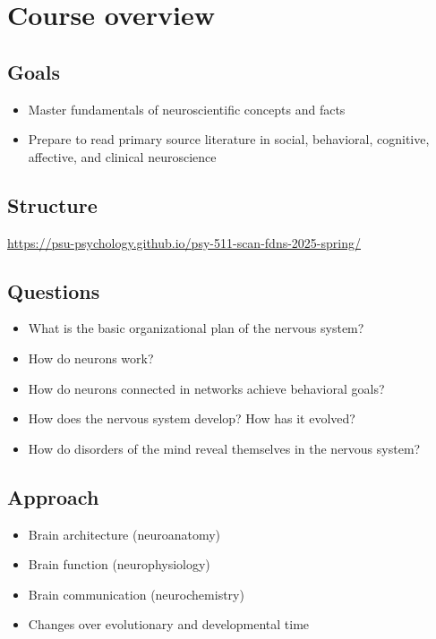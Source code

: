 \documentclass[
  letterpaper,
  DIV=11,
  numbers=noendperiod]{scrartcl}
\providecommand{\tightlist}{%
  \setlength{\itemsep}{0pt}\setlength{\parskip}{0pt}}\usepackage{longtable,booktabs,array}
\begin{document}
\section{Course overview}\label{course-overview}

\subsection{Goals}\label{goals}

\begin{itemize}
\tightlist
\item
  Master fundamentals of neuroscientific concepts and facts
\item
  Prepare to read primary source literature in social, behavioral,
  cognitive, affective, and clinical neuroscience
\end{itemize}

\subsection{Structure}\label{structure}

\url{https://psu-psychology.github.io/psy-511-scan-fdns-2025-spring/}

\subsection{Questions}\label{questions}

\begin{itemize}
\tightlist
\item
  What is the basic organizational plan of the nervous system?
\item
  How do neurons work?
\item
  How do neurons connected in networks achieve behavioral goals?
\item
  How does the nervous system develop? How has it evolved?
\item
  How do disorders of the mind reveal themselves in the nervous system?
\end{itemize}

\subsection{Approach}\label{approach}

\begin{itemize}
\tightlist
\item
  Brain architecture (neuroanatomy)
\item
  Brain function (neurophysiology)
\item
  Brain communication (neurochemistry)
\item
  Changes over evolutionary and developmental time
\end{itemize}
\end{document}

